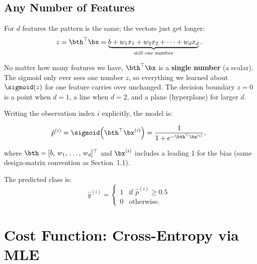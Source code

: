 \documentclass[12pt, a4paper]{article}
\begin{document}
\subsection{Any Number of Features}

For $d$ features the pattern is the same; the vectors just get longer:
\[
  z = \bth^{\top}\bx
  = \underbrace{b + w_1 x_1 + w_2 x_2 + \cdots + w_d x_d}_{\text{still one number}}.
\]

\begin{notebox}
  No matter how many features we have, $\bth^{\top}\bx$ is a
  \textbf{single number} (a scalar).
  The sigmoid only ever sees one number $z$, so everything we learned
  about $\sigmoid(z)$ for one feature carries over unchanged.
  The decision boundary $z = 0$ is a point when $d = 1$, a line when $d = 2$,
  and a plane (hyperplane) for larger $d$.
\end{notebox}

Writing the observation index $i$ explicitly, the model is:

\begin{equation}
  \hat{p}^{(i)} = \sigmoid\!\left(\bth^{\top}\bx^{(i)}\right)
  = \frac{1}{1 + e^{-\bth^{\top}\bx^{(i)}}},
  \label{eq:logreg}
\end{equation}

where $\bth = [b,\, w_1,\, \ldots,\, w_d]^{\top}$ and $\bx^{(i)}$ includes a
leading 1 for the bias (same design-matrix convention as Section~1.1).

The predicted class is:
\[
  \hat{y}^{(i)} =
  \begin{cases} 1 & \text{if } \hat{p}^{(i)} \ge 0.5 \\ 0 & \text{otherwise.} \end{cases}
\]

\section{Cost Function: Cross-Entropy via MLE}
\end{document}
